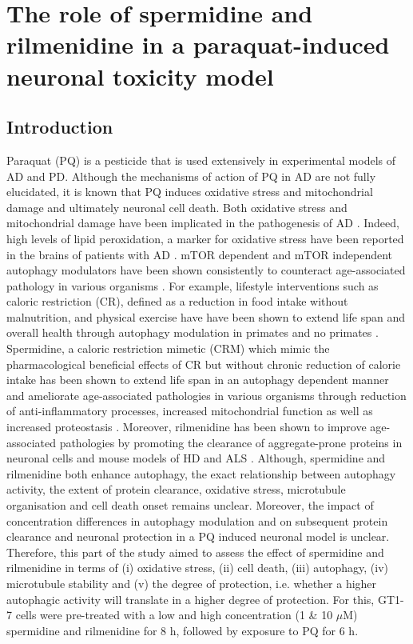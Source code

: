\chapter{The role of spermidine and rilmenidine in a paraquat-induced neuronal toxicity model}
\section{Introduction}
Paraquat (PQ) is a pesticide that is used extensively in experimental models of AD and PD. Although the mechanisms of action of PQ in AD are not fully elucidated, it is known that PQ induces oxidative stress and mitochondrial damage \citep{Chen2012} and ultimately neuronal cell death. Both oxidative stress and mitochondrial damage have been implicated in the pathogenesis of AD \citep{Chen2012,Lin2006}. Indeed, high levels of lipid peroxidation, a marker for oxidative stress have been reported in the brains of patients with AD \citep{Wang2014,Zhao2013}. mTOR dependent and mTOR independent autophagy modulators have been shown consistently to counteract age-associated pathology in various organisms \citep{lumkwana2017}. For example, lifestyle interventions such as caloric restriction (CR), defined as a reduction in food intake without malnutrition,  and physical exercise have have been shown to extend life span and overall health through autophagy modulation in primates and no primates \citep{Law2018,Frederiksen2017,Liu2019,Lin2017}. Spermidine, a caloric restriction mimetic (CRM) which mimic the pharmacological beneficial effects of CR but without chronic reduction of calorie intake has been shown to extend life span in an autophagy dependent manner and ameliorate age-associated pathologies in various organisms \citep{Buttner2014,Eisenberg2016a,Gupta2016,Morselli2011,Morselli2009,Sigrist2014,Yue2017,Zhang2017} through reduction of anti-inflammatory processes, increased mitochondrial function as well as increased proteostasis \citep{Madeo2018}. Moreover, rilmenidine has been shown to improve age-associated pathologies by promoting the clearance of aggregate-prone proteins in neuronal cells and mouse models of HD and ALS \citep{Perera2018,Rose2010}. Although, spermidine and rilmenidine both enhance autophagy, the exact relationship between autophagy activity, the extent of protein clearance, oxidative stress, microtubule organisation and cell death onset remains unclear. Moreover, the impact of concentration differences in autophagy modulation and on subsequent protein clearance and neuronal protection in a PQ induced neuronal model is unclear. Therefore, this part of the study aimed to assess the effect of spermidine and rilmenidine in terms of (i) oxidative stress, (ii) cell death, (iii) autophagy, (iv) microtubule stability and (v) the degree of protection, i.e. whether a higher autophagic activity will translate in a higher degree of protection. For this, GT1-7 cells were pre-treated with a low and high concentration (1 \& 10 $\mu$M) spermidine and rilmenidine for 8 h, followed by exposure to PQ for 6 h.

